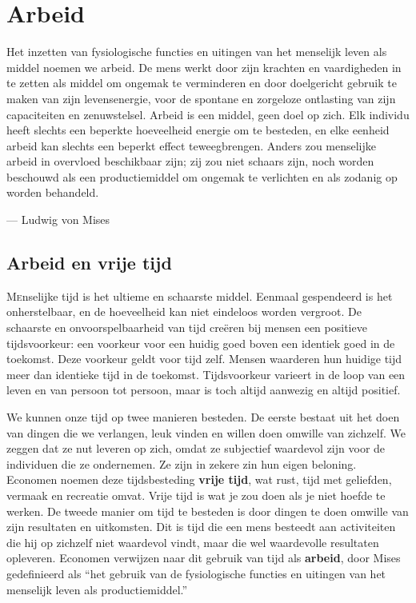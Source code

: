 \chapter{Arbeid}
\begin{blockquotebox}
    Het inzetten van fysiologische functies en uitingen van het menselijk leven als middel noemen we arbeid. De mens werkt door zijn krachten en vaardigheden in te zetten als middel om ongemak te verminderen en door doelgericht gebruik te maken van zijn levensenergie, voor de spontane en zorgeloze  ontlasting van zijn capaciteiten en zenuwstelsel. Arbeid is een middel, geen doel op zich. Elk individu heeft slechts een beperkte hoeveelheid energie om te besteden, en elke eenheid arbeid kan slechts een beperkt effect teweegbrengen. Anders zou menselijke arbeid in overvloed beschikbaar zijn; zij zou niet schaars zijn, noch worden beschouwd als een productiemiddel om ongemak te verlichten en als zodanig op worden behandeld.\footnotemark \par\raggedleft--- Ludwig von Mises
\end{blockquotebox}
\autocite{37}

\section{Arbeid en vrije tijd}

\lettrine{M}enselijke tijd is het ultieme en schaarste middel. Eenmaal gespendeerd
is het onherstelbaar, en de hoeveelheid kan niet eindeloos worden
vergroot. De schaarste en onvoorspelbaarheid van tijd creëren bij mensen
een positieve tijdsvoorkeur: een voorkeur voor een huidig goed boven een
identiek goed in de toekomst. Deze voorkeur geldt voor tijd zelf. Mensen
waarderen hun huidige tijd meer dan identieke tijd in de toekomst.
Tijdsvoorkeur varieert in de loop van een leven en van persoon tot
persoon, maar is toch altijd aanwezig en altijd positief.

We kunnen onze tijd op twee manieren besteden. De eerste bestaat uit het
doen van dingen die we verlangen, leuk vinden en willen doen omwille van
zichzelf. We zeggen dat ze nut leveren op zich, omdat ze subjectief
waardevol zijn voor de individuen die ze ondernemen. Ze zijn in zekere
zin hun eigen beloning. Economen noemen deze tijdsbesteding
\textbf{vrije tijd}, wat rust, tijd met geliefden, vermaak en recreatie
omvat. Vrije tijd is wat je zou doen als je niet hoefde te werken. De
tweede manier om tijd te besteden is door dingen te doen omwille van
zijn resultaten en uitkomsten. Dit is tijd die een mens besteedt aan
activiteiten die hij op zichzelf niet waardevol vindt, maar die wel
waardevolle resultaten opleveren. Economen verwijzen naar dit gebruik
van tijd als \textbf{arbeid}, door Mises gedefinieerd als ``het gebruik
van de fysiologische functies en uitingen van het menselijk leven als
productiemiddel.''\autocite{38}

